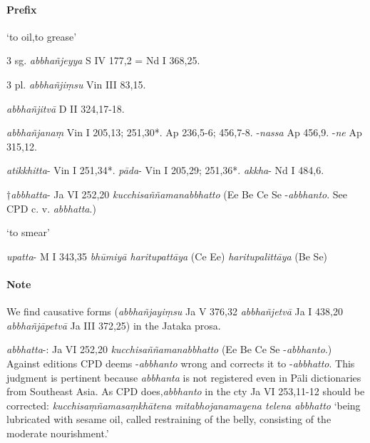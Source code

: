 \documentclass[11pt]{article}
\newcommand*\ṛ{r\symbol{"325}}
\newcommand*\Ṛ{R\symbol{"325}}
\newcommand*\ṝ{r\symbol{"304}\symbol{"325}}
\newcommand*\Ṝ{R\symbol{"304}\symbol{"325}}
\newcommand*\ḷ{l\symbol{"325}}
\newcommand*\ḹ{l\symbol{"304}\symbol{"325}}
\newcommand*\Ḷ{L\symbol{"325}}
\newcommand*\Ḹ{L\symbol{"304}\symbol{"325}}
\begin{document}
\paragraph*{Prefix}
\begin{description}[leftmargin=\parindent]
\item[abhi-] `to oil,to grease'
	\begin{description}[leftmargin=\parindent]
	\item[opt] 3 sg.  \textit{abbhañjeyya} S IV 177,2 = Nd I 368,25.
	\item[pret.] 3 pl. \textit{abbhañjiṃsu} Vin III 83,15.
	\item[abs.] \textit{abbhañjitvā} D II 324,17-18.
	\item[part.pres.] \textit{abbhañjanaṃ} Vin I 205,13; 251,30*. Ap 236,5-6; 456,7-8.
	-\textit{nassa} Ap 456,9. -\textit{ne} Ap 315,12.
		\begin{description}[leftmargin=\parindent]
		\item[comp.] \textit{atikkhitta}- Vin I 251,34*. \textit{pāda}- Vin I 205,29; 251,36*. \textit{akkha}- Nd I 484,6.
		\end{description}	
	\item[ppp.] †\textit{abbhatta}- Ja VI 252,20 \textit{kucchisaññamanabbhatto} (Ee Be Ce Se -\textit{abbhanto}. See CPD c. v. \textit{abbhatta}.)
	\end{description}
\item[upa-] `to smear'
	\begin{description}[leftmargin=\parindent]
	\item[ppp.] \textit{upatta}- M I 343,35 \textit{bhūmiyā haritupattāya} (Ce Ee) \textit{haritupalittāya} (Be Se)
	\end{description}
\end{description}
\paragraph*{Note}
We find causative forms (\textit{abbhañjayiṃsu} Ja V 376,32 \textit{abbhañjetvā} Ja I 438,20 \textit{abbhañjāpetvā} Ja III 372,25) in the Jataka prosa.

\textit{abbhatta}-: Ja VI 252,20 \textit{kucchisaññamanabbhatto} (Ee Be Ce Se -\textit{abbhanto}.)
Against editions CPD deems  -\textit{abbhanto} wrong and corrects it to -\textit{abbhatto}.
This judgment is pertinent because \textit{abbhanta} is not registered even in Pāli dictionaries from Southeast Asia.
As CPD does,\textit{abbhanto} in the cty Ja VI 253,11-12 should be corrected:
\textit{kucchisaṃñamasaṃkhātena mitabhojanamayena telena abbhatto}
`being lubricated with sesame oil, called restraining of the belly, consisting of the moderate nourishment.'
\end{document}
